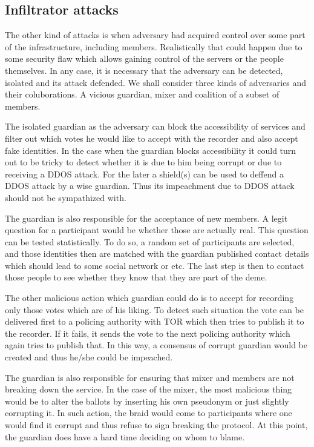 \documentclass[12pt,a4paper]{article}
\let\Oldsubsection\subsection
\renewcommand{\subsection}{\FloatBarrier\Oldsubsection}
\begin{document}
\subsection{Infiltrator attacks}
The other kind of attacks is when adversary had acquired control over some part of the infrastructure, including members. Realistically that could happen due to some security flaw which allows gaining control of the servers or the people themselves. In any case, it is necessary that the adversary can be detected, isolated and its attack defended. We shall consider three kinds of adversaries and their coluborations. A vicious guardian, mixer and coalition of a subset of members.\par
The isolated guardian as the adversary can block the accessibility of services and filter out which votes he would like to accept with the recorder and also accept fake identities. In the case when the guardian blocks accessibility it could turn out to be tricky to detect whether it is due to him being corrupt or due to receiving a DDOS attack. For the later a shield(s) can be used to deffend a DDOS attack by a wise guardian. Thus its impeachment due to DDOS attack should not be sympathized with.\par
The guardian is also responsible for the acceptance of new members. A legit question for a participant would be whether those are actually real. This question can be tested statistically. To do so, a random set of participants are selected, and those identities then are matched with the guardian published contact details which should lead to some social network or etc. The last step is then to contact those people to see whether they know that they are part of the deme.\par
The other malicious action which guardian could do is to accept for recording only those votes which are of his liking. To detect such situation the vote can be delivered first to a policing authority with TOR which then tries to publish it to the recorder. If it fails, it sends the vote to the next policing authority which again tries to publish that. In this way, a consensus of corrupt guardian would be created and thus he/she could be impeached.\par
The guardian is also responsible for ensuring that mixer and members are not breaking down the service. In the case of the mixer, the most malicious thing would be to alter the ballots by inserting his own pseudonym or just slightly corrupting it. In such action, the braid would come to participants where one would find it corrupt and thus refuse to sign breaking the protocol. At this point, the guardian does have a hard time deciding on whom to blame.\par
\end{document}
